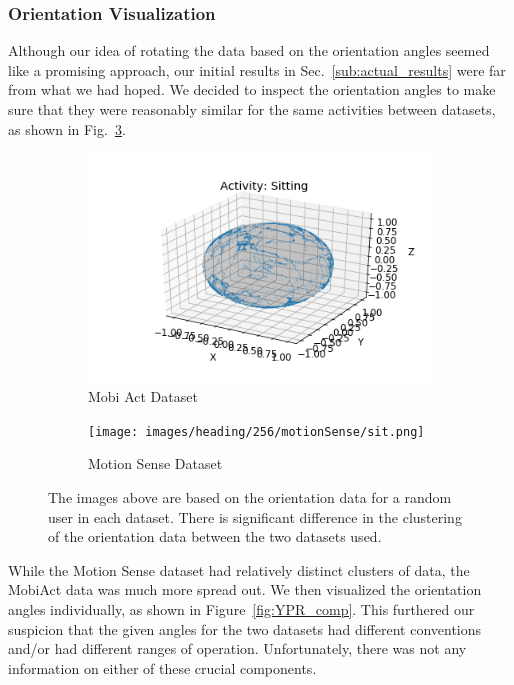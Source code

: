 \subsubsection{Orientation Visualization}
\label{sub:orien_vis}

Although our idea of rotating the data based on the orientation angles seemed like a promising approach, our initial results in Sec.~\ref{sub:actual_results} were far from what we had hoped. We decided to inspect the orientation angles to make sure that they were reasonably similar for the same activities between datasets, as shown in Fig.~\ref{fig:sitting_Globe}.

\begin{figure}[hb]
\begin{subfigure}{.5\textwidth}
  \centering
    \includegraphics[width = \textwidth]{images/heading/256/mobiAct/sit.png}
    \caption{Mobi Act Dataset}
    \label{fig:mobiAct_sitting_orient}
\end{subfigure}
\begin{subfigure}{.5\textwidth}
  \centering
  \centering
  \texttt{[image: images/heading/256/motionSense/sit.png]}  
  \caption{Motion Sense Dataset}
  \label{fig:motionSense_sitting_orient}
\end{subfigure}
\caption{The images above are based on the orientation data for a random user in each dataset. There is significant difference in the clustering of the orientation data between the two datasets used.}
\label{fig:sitting_Globe}
\end{figure}

While the Motion Sense dataset had relatively distinct clusters of data, the MobiAct data was much more spread out. We then visualized the orientation angles individually, as shown in Figure~\ref{fig:YPR_comp}. This furthered our suspicion that the given angles for the two datasets had different conventions and/or had different ranges of operation. Unfortunately, there was not any information on either of these crucial components.

